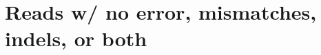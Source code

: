 \documentclass{report}
\begin{document}
% 

% 

% 


\section{Reads w/ no error, mismatches, indels, or both}




\end{document}
